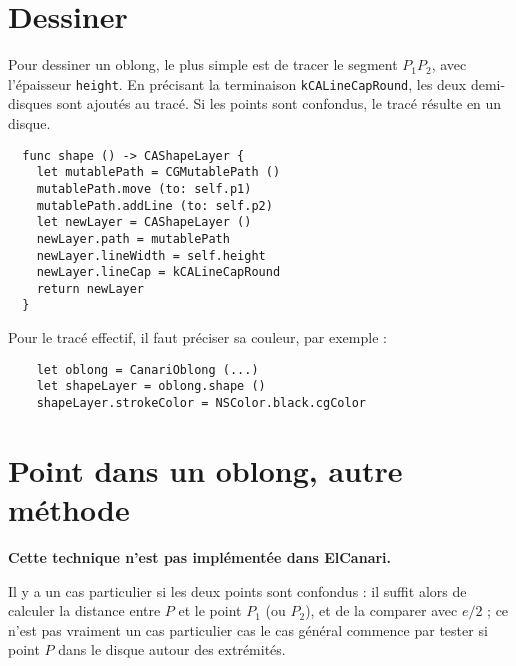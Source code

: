 \section{Dessiner}

Pour dessiner un oblong, le plus simple est de tracer le segment $P_1P_2$, avec l'épaisseur \texttt{height}. En précisant la terminaison \texttt{kCALineCapRound}, les deux demi-disques sont ajoutés au tracé. Si les points sont confondus, le tracé résulte en un disque.

\begin{lstlisting}
  func shape () -> CAShapeLayer {
    let mutablePath = CGMutablePath ()
    mutablePath.move (to: self.p1)
    mutablePath.addLine (to: self.p2)
    let newLayer = CAShapeLayer ()
    newLayer.path = mutablePath
    newLayer.lineWidth = self.height
    newLayer.lineCap = kCALineCapRound
    return newLayer
  }
\end{lstlisting}


Pour le tracé effectif, il faut préciser sa couleur, par exemple :
\begin{lstlisting}
    let oblong = CanariOblong (...)
    let shapeLayer = oblong.shape ()
    shapeLayer.strokeColor = NSColor.black.cgColor
\end{lstlisting}








\section{Point dans un oblong, autre méthode}

{\bf Cette technique n'est pas implémentée dans ElCanari.}

\begin{center}
\end{center}

Il y a un cas particulier si les deux points sont confondus : il suffit alors de calculer la distance entre $P$ et le point $P_1$ (ou $P_2$), et de la comparer avec $e/2$ ; ce n'est pas vraiment un cas particulier cas le cas général commence par tester si point $P$ dans le disque autour des extrémités.

